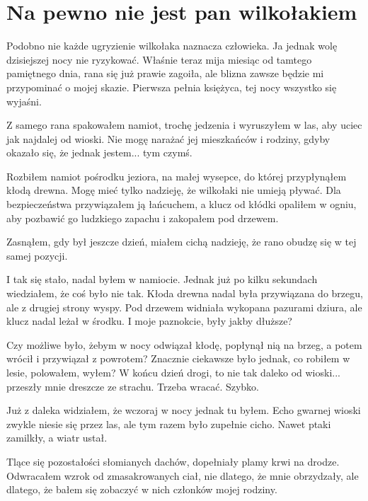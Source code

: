\chapter{Na pewno nie jest pan wilkołakiem} 


Podobno nie każde ugryzienie wilkołaka naznacza człowieka.
Ja jednak wolę dzisiejszej nocy nie ryzykować.
Właśnie teraz mija miesiąc od tamtego pamiętnego dnia, rana się już prawie zagoiła, ale blizna zawsze będzie mi przypominać o mojej skazie.
Pierwsza pełnia księżyca, tej nocy wszystko się wyjaśni.

Z samego rana spakowałem namiot, trochę jedzenia i wyruszyłem w las, aby uciec jak najdalej od wioski.
Nie mogę narażać jej mieszkańców i rodziny, gdyby okazało się, że jednak jestem... tym czymś.

Rozbiłem namiot pośrodku jeziora, na małej wysepce, do której przypłynąłem kłodą drewna. 
Mogę mieć tylko nadzieję, że wilkołaki nie umieją pływać.
Dla bezpieczeństwa przywiązałem ją łańcuchem, a klucz od kłódki opaliłem w ogniu, aby pozbawić go ludzkiego zapachu i zakopałem pod drzewem.

Zasnąłem, gdy był jeszcze dzień, miałem cichą nadzieję, że rano obudzę się w tej samej pozycji.

\divider{}

I tak się stało, nadal byłem w namiocie. Jednak już po kilku sekundach wiedziałem, że coś było nie tak.
Kłoda drewna nadal była przywiązana do brzegu, ale z drugiej strony wyspy.
Pod drzewem widniała wykopana pazurami dziura, ale klucz nadal leżał w środku.
I moje paznokcie, były jakby dłuższe?

Czy możliwe było, żebym w nocy odwiązał kłodę, popłynął nią na brzeg, a potem wrócił i przywiązał z powrotem?
Znacznie ciekawsze było jednak, co robiłem w lesie, polowałem, wyłem? 
W końcu dzień drogi, to nie tak daleko od wioski... przeszły mnie dreszcze ze strachu.
Trzeba wracać. Szybko.

\divider{}

Już z daleka widziałem, że wczoraj w nocy jednak tu byłem.
Echo gwarnej wioski zwykle niesie się przez las, ale tym razem było zupełnie cicho.
Nawet ptaki zamilkły, a wiatr ustał.

Tlące się pozostałości słomianych dachów, dopełniały plamy krwi na drodze.
Odwracałem wzrok od zmasakrowanych ciał, nie dlatego, że mnie obrzydzały, ale dlatego, że bałem się zobaczyć w nich członków mojej rodziny.

